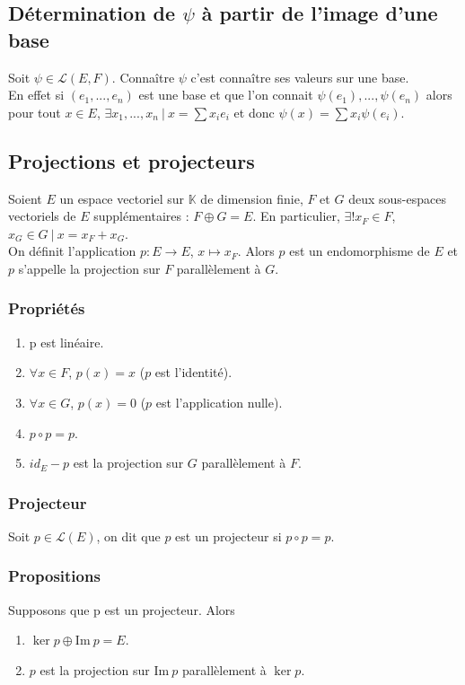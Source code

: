 \documentclass[a4paper,10pt]{book} %
\newcommand{\K}{\mathbb{K}}
\newcommand{\ev}{espace vectoriel }
\newcommand{\sevs}{sous-espaces vectoriels }
\newcommand{\tq}{~|~}
\newcommand{\Ima}{\mathrm{Im}~} %
\begin{document}
\newpage

\subsection{Détermination de $\psi$ à partir de l'image d'une base}
Soit $\psi\in \mathcal{L}(E,F)$. Connaître $\psi$ c'est connaître ses valeurs sur une base.\\

En effet si $(e_1,...,e_n)$ est une base et que l'on connait $\psi(e_1),...,\psi(e_n)$ alors pour tout $x\in E$, $\exists x_1,...,x_n \tq x=\sum x_ie_i$ et donc $\psi(x)=\sum x_i\psi(e_i)$.

\subsection{Projections et projecteurs}
Soient $E$ un \ev sur $\K$ de dimension finie, $F$ et $G$ deux \sevs de $E$ supplémentaires : $F\oplus G=E$. En particulier, $\exists! x_F\in F$, $x_G\in G \tq x=x_F+x_G$.\\

On définit l'application $p : E\rightarrow E$, $x\mapsto x_F$. Alors $p$ est un endomorphisme de $E$ et $p$ s'appelle la projection sur $F$ parallèlement à $G$.

\subsubsection{Propriétés}
\begin{enumerate}
\item p est linéaire.
\item $\forall x\in F$, $p(x)=x$ ($p$ est l'identité).
\item $\forall x\in G$, $p(x)=0$ ($p$ est l'application nulle).
\item $p\circ p=p$.
\item $id_E -p$ est la projection sur $G$ parallèlement à $F$.
\end{enumerate}

\subsubsection{Projecteur}
Soit $p\in \mathcal{L}(E)$, on dit que $p$ est un projecteur si $p\circ p =p$.

\subsubsection{Propositions}
Supposons que p est un projecteur. Alors 
\begin{enumerate}
\item $\ker p\oplus \Ima p=E$.
\item $p$ est la projection sur $\Ima p$ parallèlement à $\ker p$.
\end{enumerate}
\end{document}
